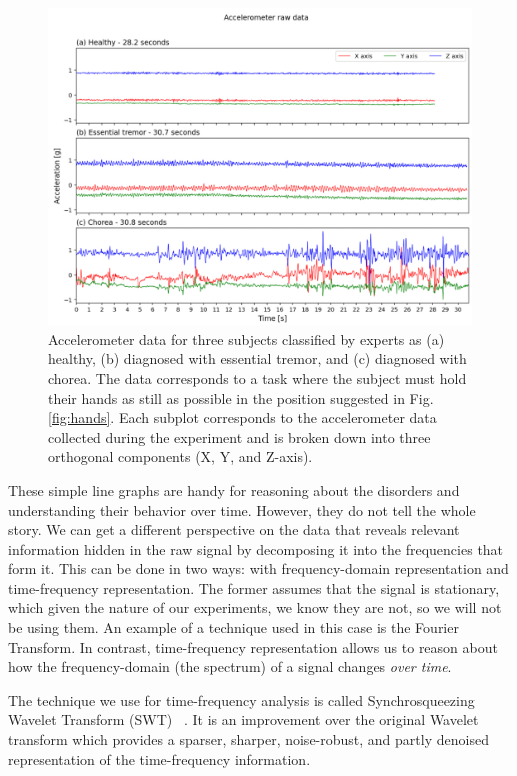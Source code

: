 \begin{figure}[ht]
\centering
\includegraphics[width=\linewidth]{figures/nemo/acc2.png}
\caption{Accelerometer data for three subjects classified by experts as (a) healthy, (b) diagnosed with essential tremor, and (c) diagnosed with chorea. The data corresponds to a task where the subject must hold their hands as still as possible in the position suggested in Fig. \ref{fig:hands}.
Each subplot corresponds to the accelerometer data collected during the experiment and is broken down into three orthogonal components (X, Y, and Z-axis). }
\label{fig:acc}
\end{figure}


These simple line graphs are handy for reasoning about the disorders and understanding their behavior over time. However, they do not tell the whole story. We can get a different perspective on the data that reveals relevant information hidden in the raw signal by decomposing it into the frequencies that form it. This can be done in two ways: with frequency-domain representation and time-frequency representation. The former assumes that the signal is stationary, which given the nature of our experiments, we know they are not, so we will not be using them. An example of a technique used in this case is the Fourier Transform. In contrast, time-frequency representation allows us to reason about how the frequency-domain (the spectrum) of a signal changes \textit{over time}.

The technique we use for time-frequency analysis is called Synchrosqueezing Wavelet Transform (SWT)~ \citep{MIHALEC2016324}. It is an improvement over the original Wavelet transform \citep{wavelet} which provides a sparser, sharper, noise-robust, and partly denoised representation of the time-frequency information. 

